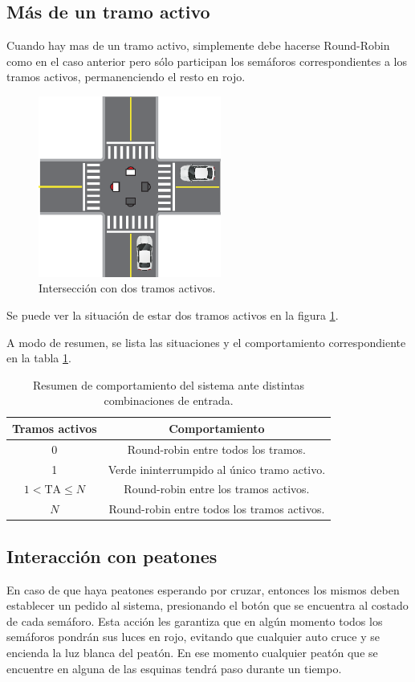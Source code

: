 \subsection{Más de un tramo activo}
Cuando hay mas de un tramo activo, simplemente debe hacerse Round-Robin como en el caso anterior pero sólo participan los semáforos correspondientes a los tramos activos, permanenciendo el resto en rojo.
\begin{figure}[htbp]
	\centering
	\includegraphics[width=6cm]{imagenes/dos-activos.eps}
	\caption{Intersección con dos tramos activos.}
	\label{fig:dos-activos}
\end{figure}

Se puede ver la situación de estar dos tramos activos en la figura \ref{fig:dos-activos}.

A modo de resumen, se lista las situaciones y el comportamiento correspondiente en la tabla \ref{tab:comportamiento}.

\begin{table}[htbp]
	\centering
	\caption{Resumen de comportamiento del sistema ante distintas combinaciones de entrada.}
	\vspace{0.25cm}
	\label{tab:comportamiento}
	\begin{tabular}{cc}
		\toprule
		\bf{Tramos activos} & \bf{Comportamiento} \\
		\midrule
		0 & Round-robin entre todos los tramos. \\
		1 & Verde ininterrumpido al único tramo activo. \\
		$1 < \mbox{TA} \le N$ & Round-robin entre los tramos activos. \\
		$N$ & Round-robin entre todos los tramos activos. \\
		\bottomrule
	\end{tabular}
\end{table}


\subsection{Interacción con peatones}
En caso de que haya peatones esperando por cruzar, entonces los mismos deben establecer un pedido al sistema, presionando el botón que se encuentra al costado de cada semáforo.
Esta acción les garantiza que en algún momento todos los semáforos pondrán sus luces en rojo, evitando que cualquier auto cruce y se encienda la luz blanca del peatón.
En ese momento cualquier peatón que se encuentre en alguna de las esquinas tendrá paso durante un tiempo.

